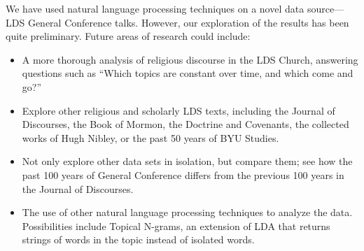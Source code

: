 \documentclass[landscape,final]{baposter}
\begin{document}
\begin{poster}
{	We have used natural language processing techniques on a novel data
	source---LDS General Conference talks.  However, our exploration of the
	results has been quite preliminary.  Future areas of research could 
	include:
	\begin{itemize}
	  \item A more thorough analysis of religious discourse in the LDS Church,
		answering questions such as ``Which topics are constant over time, and
		which come and go?''
	  \item Explore other religious and scholarly LDS texts, including the
		Journal of Discourses, the Book of Mormon, the Doctrine and Covenants,
		the collected works of Hugh Nibley, or the past 50 years of BYU
		Studies.
	  \item Not only explore other data sets in isolation, but compare them;
		see how the past 100 years of General Conference differs from the
		previous 100 years in the Journal of Discourses.
	  \item The use of other natural language processing techniques to analyze
		the data.  Possibilities include Topical N-grams, an extension of LDA
		that returns strings of words in the topic instead of isolated words.
	\end{itemize}

  }

\end{poster}
\end{document}
